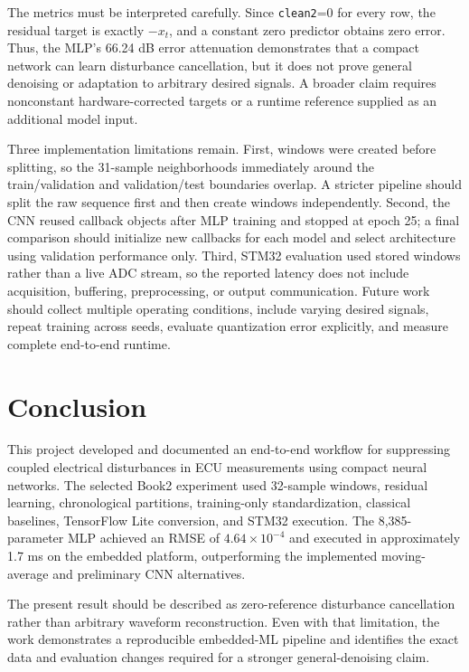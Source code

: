 \documentclass[conference]{IEEEtran}
\begin{document}
The metrics must be interpreted carefully. Since \texttt{clean2}=0 for every row, the residual target is exactly $-x_t$, and a constant zero predictor obtains zero error. Thus, the MLP's 66.24 dB error attenuation demonstrates that a compact network can learn disturbance cancellation, but it does not prove general denoising or adaptation to arbitrary desired signals. A broader claim requires nonconstant hardware-corrected targets or a runtime reference supplied as an additional model input.

Three implementation limitations remain. First, windows were created before splitting, so the 31-sample neighborhoods immediately around the train/validation and validation/test boundaries overlap. A stricter pipeline should split the raw sequence first and then create windows independently. Second, the CNN reused callback objects after MLP training and stopped at epoch 25; a final comparison should initialize new callbacks for each model and select architecture using validation performance only. Third, STM32 evaluation used stored windows rather than a live ADC stream, so the reported latency does not include acquisition, buffering, preprocessing, or output communication. Future work should collect multiple operating conditions, include varying desired signals, repeat training across seeds, evaluate quantization error explicitly, and measure complete end-to-end runtime.

\section{Conclusion}
This project developed and documented an end-to-end workflow for suppressing coupled electrical disturbances in ECU measurements using compact neural networks. The selected Book2 experiment used 32-sample windows, residual learning, chronological partitions, training-only standardization, classical baselines, TensorFlow Lite conversion, and STM32 execution. The 8,385-parameter MLP achieved an RMSE of $4.64\times10^{-4}$ and executed in approximately 1.7 ms on the embedded platform, outperforming the implemented moving-average and preliminary CNN alternatives.

The present result should be described as zero-reference disturbance cancellation rather than arbitrary waveform reconstruction. Even with that limitation, the work demonstrates a reproducible embedded-ML pipeline and identifies the exact data and evaluation changes required for a stronger general-denoising claim.
\end{document}
